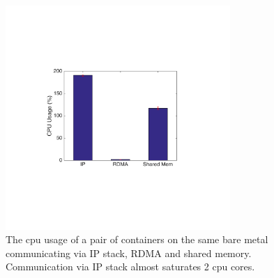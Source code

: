 
\begin{figure}[!ht]
     \centering 
     \includegraphics[width=3.35in]{figures/motivation/eval_baremetal_cpu.pdf} 
     \caption{\label{fig:eval_baremetal_cpu} The cpu usage of a pair of containers on the same bare metal communicating via IP stack, RDMA and shared memory. Communication via IP stack almost saturates 2 cpu cores.} 
\end{figure} 

\fi